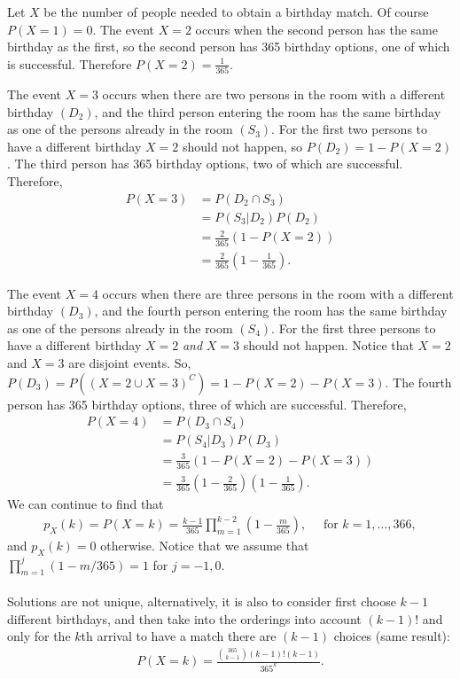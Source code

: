 

\setcounter{theorem}{0}

\begin{exercise}[BH.3.1]
	\begin{solution}
	Let $X$ be the number of people needed to obtain a birthday match. Of course $P(X=1)=0$. The event $X=2$ occurs when the second person has the same birthday as the first, so the second person has 365 birthday options, one of which is successful. Therefore $P(X=2)=\frac{1}{365}$. 

	The event $X=3$ occurs when there are two persons in the room with a different birthday $(D_{2})$, and the third person entering the room has the same birthday as one of the persons already in the room $(S_3)$. For the first two persons to have a different birthday $X=2$ should not happen, so $P(D_{2})=1-P(X=2)$. The third person has 365 birthday options, two of which are successful. Therefore,
	\begin{align*}
		P(X=3) &= P(D_{2} \cap S_{3})\\
		& = P(S_{3}|D_{2})P(D_{2})\\
		& = \frac{2}{365}(1-P(X=2))\\
		& = \frac{2}{365}\left(1-\frac{1}{365}\right).
	\end{align*}

	The event $X=4$ occurs when there are three persons in the room with a different birthday $(D_{3})$, and the fourth person entering the room has the same birthday as one of the persons already in the room $(S_{4})$. For the first three persons to have a different birthday $X=2$ \textit{and} $X=3$ should not happen. Notice that $X=2$ and $X=3$ are disjoint events. So, $P(D_{3}) = P((X=2\cup X=3)^{C}) = 1-P(X=2)-P(X=3)$.   The fourth person has 365 birthday options, three of which are successful. Therefore,
	\begin{align*}
		P(X=4) &= P(D_{3} \cap S_{4})\\
		& = P(S_{4}|D_{3})P(D_{3})\\
		& = \frac{3}{365}(1-P(X=2)-P(X=3))\\
		& = \frac{3}{365}\left(1-\frac{2}{365}\right)\left(1-\frac{1}{365}\right).
	\end{align*}
	We can continue to find that 
	\begin{align*}
		p_{X}(k) = P(X=k) = \frac{k-1}{365}\prod_{m=1}^{k-2}\left(1-\frac{m}{365}\right), \quad \text{ for } k = 1,\ldots,366,
	\end{align*}
	and $p_{X}(k)= 0$ otherwise. Notice that we assume that $\prod_{m=1}^{j}(1-m/365)=1$ for $j=-1,0$.\\~\\
	Solutions are not unique, alternatively, it is also to consider first choose $k-1$ different birthdays, and then take into the orderings into account $(k-1)!$ and only for the $k$th arrival to have a match there are $(k-1)$ choices (same result):
	\begin{align*}
	P(X=k)= \frac{{365\choose k-1}(k-1)!(k-1) }{365^k}.
	\end{align*}
\end{solution}
\end{exercise}

